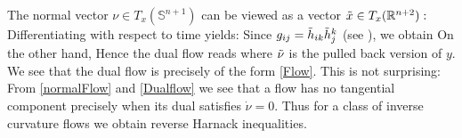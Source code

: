 {The normal vector $\nu\in T_x(\mathbb{S}^{n+1})$ can be viewed as a vector $\tilde{x}\in T_x(\R^{n+2}):$
Differentiating with respect to time yields:
Since $g_{ij}=\~h_{ik}\~h^k_j$ (see \cite[Thm.~9.2.5]{Gerhardt:/2006}), we obtain
On the other hand,
 Hence the dual flow reads
 where $\~\nu$ is the pulled back version of $y$. We see that the dual flow is precisely of the form \eqref{Flow}. This is not surprising: From \eqref{normalFlow} and \eqref{Dualflow} we see that a flow has no tangential component precisely when its dual satisfies $\dot{\nu}=0.$
Thus for a class of inverse curvature flows we obtain reverse Harnack inequalities. 
}
